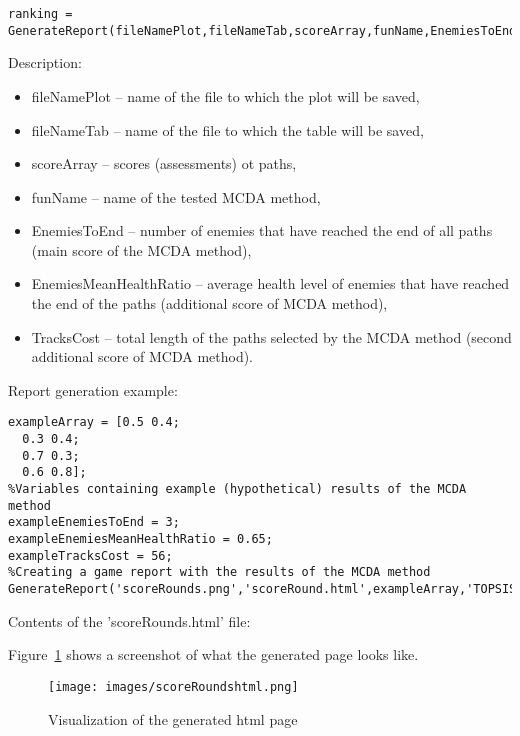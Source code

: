 \begin{lstlisting}[style=Matlab-editor]
ranking = GenerateReport(fileNamePlot,fileNameTab,scoreArray,funName,EnemiesToEnd,EnemiesMeanHealthRatio,TracksCost);
\end{lstlisting}

Description:
\begin{itemize}
\item  fileNamePlot -- name of the file to which the plot will be saved,
\item  fileNameTab -- name of the file to which the table will be saved,
\item  scoreArray -- scores (assessments) ot paths,
\item  funName -- name of the tested MCDA method,
\item  EnemiesToEnd -- number of enemies that have reached the end of all paths (main score of the MCDA method),
\item  EnemiesMeanHealthRatio -- average health level of enemies that have reached the end of the paths (additional score of MCDA method),
\item  TracksCost -- total length of the paths selected by the MCDA method (second additional score of MCDA method).
\end{itemize}

Report generation example:
\begin{lstlisting}[style=Matlab-editor]
%Array containing example (hypothetical) path selection results using the MCDA method in a game of four rounds with two paths to choose from
exampleArray = [0.5 0.4;
  0.3 0.4;
  0.7 0.3;
  0.6 0.8];
%Variables containing example (hypothetical) results of the MCDA method
exampleEnemiesToEnd = 3;
exampleEnemiesMeanHealthRatio = 0.65;
exampleTracksCost = 56;
%Creating a game report with the results of the MCDA method
GenerateReport('scoreRounds.png','scoreRound.html',exampleArray,'TOPSIS',exampleEnemiesToEnd,exampleEnemiesMeanHealthRatio,exampleTracksCost);
\end{lstlisting}

Contents of the 'scoreRounds.html' file:


Figure~\ref{Fig:scoreRoundshtml} shows a screenshot of what the generated page looks like.

\begin{figure}
\texttt{[image: images/scoreRoundshtml.png]}
\caption{Visualization of the generated html page}
\label{Fig:scoreRoundshtml}
\end{figure} 

